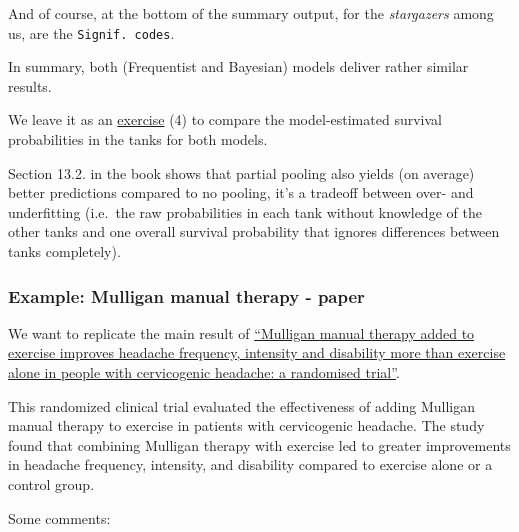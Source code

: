 \documentclass[
]{article}
\begin{document}
And of course, at the bottom of the summary output, for the
\emph{stargazers} among us, are the \texttt{Signif.\ codes}.

In summary, both (Frequentist and Bayesian) models deliver rather
similar results.

We leave it as an \hyperref[exercise4_LMM]{exercise} (4) to compare the
model-estimated survival probabilities in the tanks for both models.

Section 13.2. in the book shows that partial pooling also yields (on
average) better predictions compared to no pooling, it's a tradeoff
between over- and underfitting (i.e.~the raw probabilities in each tank
without knowledge of the other tanks and one overall survival
probability that ignores differences between tanks completely).

\subsubsection{Example: Mulligan manual therapy - paper}\label{mulligan}

We want to replicate the main result of
\href{https://doi.org/10.1016/j.jphys.2024.06.002}{``Mulligan manual
therapy added to exercise improves headache frequency, intensity and
disability more than exercise alone in people with cervicogenic
headache: a randomised trial''}.

This randomized clinical trial evaluated the effectiveness of adding
Mulligan manual therapy to exercise in patients with cervicogenic
headache. The study found that combining Mulligan therapy with exercise
led to greater improvements in headache frequency, intensity, and
disability compared to exercise alone or a control group.

Some comments:
\end{document}
